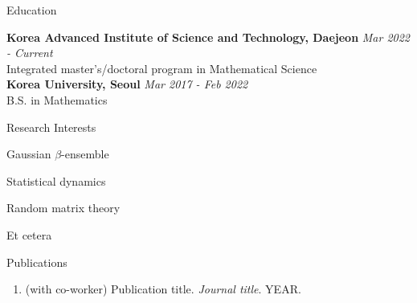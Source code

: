 \documentclass[
	a4paper, %
	11pt, %
]{resume} %
\begin{document}

\begin{rSection}{Education}
	
	
	\textbf{Korea Advanced Institute of Science and Technology, Daejeon} \hfill \textit{Mar 2022 - Current} \\ 
	Integrated master’s/doctoral program in Mathematical Science
	\\
	\textbf{Korea University, Seoul} \hfill \textit{Mar 2017 - Feb 2022} \\ 
	B.S. in Mathematics
\end{rSection}

\begin{rSection}{Research Interests}
	\item Gaussian $\beta$-ensemble
	\item Statistical dynamics
	\item Random matrix theory
	\item Et cetera
\end{rSection}

\begin{rSection}{Publications}
	\begin{enumerate}
		\item (with co-worker) Publication title. \textit{Journal title}. YEAR.
	\end{enumerate}
\end{rSection}
\end{document}
